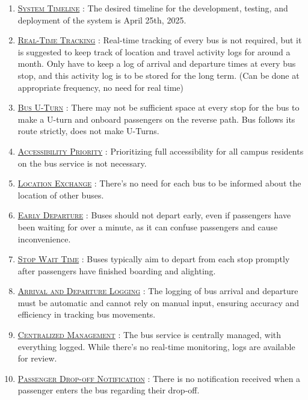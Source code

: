 \begin{enumerate}
    \item \underline{\textsc{System Timeline}} : The desired timeline for the development, testing, and deployment of the system is April 25th, 2025.

    \item {}\underline{\textsc{Real-Time Tracking}} : Real-time tracking of every bus is not required, but it is suggested to keep track of location and travel activity logs for around a month. Only have to keep a log of arrival and departure times at every bus stop, and this activity log is to be stored for the long term. (Can be done at appropriate frequency, no need for real time)

    \item {}\underline{\textsc{Bus U-Turn}} : There may not be sufficient space at every stop for the bus to make a U-turn and onboard passengers on the reverse path. Bus follows its route strictly, does not make U-Turns.
    
    \item {}\underline{\textsc{Accessibility Priority}} : Prioritizing full accessibility for all campus residents on the bus service is not necessary.

    \item \underline{\textsc{Location Exchange}} : There's no need for each bus to be informed about the location of other buses.

    \item \underline{\textsc{Early Departure}} : Buses should not depart early, even if passengers have been waiting for over a minute, as it can confuse passengers and cause inconvenience.

    \item \underline{\textsc{Stop Wait Time}} : Buses typically aim to depart from each stop promptly after passengers have finished boarding and alighting.

    \item \underline{\textsc{Arrival and Departure Logging}} : The logging of bus arrival and departure must be automatic and cannot rely on manual input, ensuring accuracy and efficiency in tracking bus movements.

    \item \underline{\textsc{Centralized Management}} : The bus service is centrally managed, with everything logged. While there's no real-time monitoring, logs are available for review. 

    \item \underline{\textsc{Passenger Drop-off Notification}} : There is no notification received when a passenger enters the bus regarding their drop-off.


\end{enumerate}
